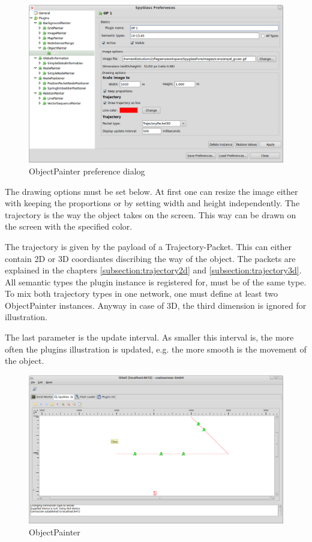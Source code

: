 \begin{figure}[htb]
  \begin{center}
    \includegraphics[width=13.2cm]{./pics/objectpainter_prefpage}
    \caption{ObjectPainter preference dialog}
    \label{pic:op_preferences}
  \end{center}
\end{figure}

The drawing options must be set below. At first one can resize the image either with keeping the proportions or by
setting width and height independently. The trajectory is the way the object takes on the screen. This way
can be drawn on the screen with the specified color.

The trajectory is given by the payload of a Trajectory-Packet. This can either contain 2D or 3D coordiantes discribing
the way of the object. The packets are explained in the chapters \ref{subsection:trajectory2d} and
\ref{subsection:trajectory3d}. All semantic types the plugin instance is registered for, must be of the same type.
To mix both trajectory types in one network, one must define at least two ObjectPainter instances. Anyway in case of
3D, the third dimension is ignored for illustration.

The last parameter is the update interval. As smaller this interval is, the more
often the plugins illustration is updated, e.g. the more smooth is the movement of the object.

\begin{figure}[htb]
  \begin{center}
    \includegraphics[width=13.2cm]{./pics/objectpainter}
    \caption{ObjectPainter}
    \label{pic:op}
  \end{center}
\end{figure}

